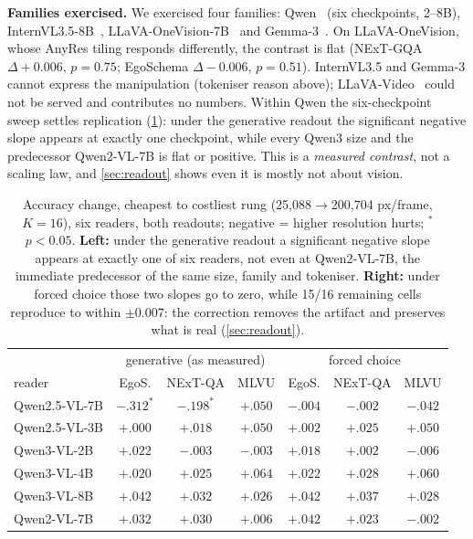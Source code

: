 \documentclass[10pt,twocolumn,letterpaper]{article}
\begin{document}
\noindent\textbf{Families exercised.} We exercised four families: Qwen~\cite{qwen25vl} (six checkpoints, 2--8B), InternVL3.5-8B~\cite{wang2025internvl35}, LLaVA-OneVision-7B~\cite{li2024onevision} and Gemma-3~\cite{gemma3}. On LLaVA-OneVision, whose AnyRes tiling responds differently, the contrast is flat (NExT-GQA $\Delta{+}0.006$, $p{=}0.75$; EgoSchema $\Delta{-}0.006$, $p{=}0.51$). InternVL3.5 and Gemma-3 cannot express the manipulation (tokeniser reason above); LLaVA-Video~\cite{zhang2024llavavideo} could not be served and contributes no numbers. Within Qwen the six-checkpoint sweep settles replication (\cref{tab:ladder}): under the generative readout the significant negative slope appears at exactly one checkpoint, while every Qwen3 size and the predecessor Qwen2-VL-7B is flat or positive. This is a \emph{measured contrast}, not a scaling law, and \cref{sec:readout} shows even it is mostly not about vision.

\begin{table}[t]
\centering
\footnotesize
\setlength{\tabcolsep}{1.5pt}
\begin{tabular}{lccc|ccc}
\toprule
 & \multicolumn{3}{c|}{generative (as measured)} & \multicolumn{3}{c}{forced choice}\\
reader & EgoS. & NExT-QA & MLVU & EgoS. & NExT-QA & MLVU\\
\midrule
Qwen2.5-VL-7B & $-.312^{*}$ & $-.198^{*}$ & $+.050$ & $-.004$ & $-.002$ & $-.042$\\
Qwen2.5-VL-3B & $+.000$ & $+.018$ & $+.050$ & $+.002$ & $+.025$ & $+.050$\\
Qwen3-VL-2B & $+.022$ & $-.003$ & $-.003$ & $+.018$ & $+.002$ & $-.006$\\
Qwen3-VL-4B & $+.020$ & $+.025$ & $+.064$ & $+.022$ & $+.028$ & $+.060$\\
Qwen3-VL-8B & $+.042$ & $+.032$ & $+.026$ & $+.042$ & $+.037$ & $+.028$\\
Qwen2-VL-7B & $+.032$ & $+.030$ & $+.006$ & $+.042$ & $+.023$ & $-.002$\\
\bottomrule
\end{tabular}
\caption{Accuracy change, cheapest to costliest rung (25,088$\rightarrow$200,704 px/frame, $K{=}16$), six readers, both readouts; negative = higher resolution hurts; $^{*}$ $p{<}0.05$. \textbf{Left:} under the generative readout a significant negative slope appears at exactly one of six readers, not even at Qwen2-VL-7B, the immediate predecessor of the same size, family and tokeniser. \textbf{Right:} under forced choice those two slopes go to zero, while 15/16 remaining cells reproduce to within $\pm0.007$: the correction removes the artifact and preserves what is real (\cref{sec:readout}).}
\label{tab:ladder}
\end{table}
\end{document}
